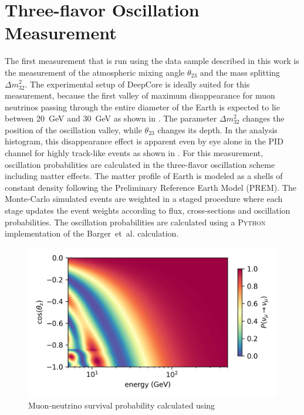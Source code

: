 \section{Three-flavor Oscillation Measurement}
\label{sec:three-flavor-measurement}
The first measurement that is run using the data sample described in this work is the measurement of the atmospheric mixing angle $\theta_{23}$ and the mass splitting $\Delta m^2_{32}$. The experimental setup of DeepCore is ideally suited for this measurement, because the first valley of maximum disappearance for muon neutrinos passing through the entire diameter of the Earth is expected to lie between 20~GeV and 30~GeV as shown in . The parameter $\Delta m^2_{32}$ changes the position of the oscillation valley, while $\theta_{23}$ changes its depth. In the analysis histogram, this disappearance effect is apparent even by eye alone in the PID channel for highly track-like events as shown in . For this measurement, oscillation probabilities are calculated in the three-flavor oscillation scheme including matter effects. The matter profile of Earth is modeled as a shells of constant density following the Preliminary Reference Earth Model (PREM). The Monte-Carlo simulated events are weighted in a staged procedure where each stage updates the event weights according to flux, cross-sections and oscillation probabilities. The oscillation probabilities are calculated using a \textsc{Python} implementation of the Barger~et~al. calculation.

\begin{figure}
    \centering
    \includegraphics[width=0.9\linewidth]{figures/measurement/three_flavor/numu_surv_prob_no_sterile_no_text.png}
    \caption{Muon-neutrino survival  probability calculated using}
    \label{fig:three-flavor-oscprob}
\end{figure}

